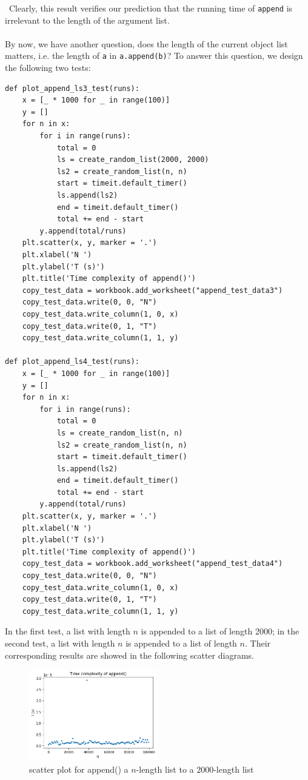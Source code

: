 \documentclass[12pt]{article}
\begin{document}
\newpage ~\newline\noindent Clearly, this result verifies our prediction that the running time of \verb|append| is irrelevant to the length of the argument list.\\\\
By now, we have another question, does the length of the current object list matters, i.e. the length of \verb|a| in \verb|a.append(b)|? To answer this question, we design the following two tests:
\lstset{language=Python, basicstyle=\ttfamily\small, breaklines=true, showspaces=false,
  showstringspaces=false, breakatwhitespace=true}
\begin{lstlisting}
def plot_append_ls3_test(runs):
    x = [_ * 1000 for _ in range(100)]
    y = []
    for n in x:
        for i in range(runs):
            total = 0
            ls = create_random_list(2000, 2000)
            ls2 = create_random_list(n, n)
            start = timeit.default_timer()
            ls.append(ls2)
            end = timeit.default_timer()
            total += end - start
        y.append(total/runs)
    plt.scatter(x, y, marker = '.')
    plt.xlabel('N ')
    plt.ylabel('T (s)')
    plt.title('Time complexity of append()')
    copy_test_data = workbook.add_worksheet("append_test_data3")
    copy_test_data.write(0, 0, "N")
    copy_test_data.write_column(1, 0, x)
    copy_test_data.write(0, 1, "T")
    copy_test_data.write_column(1, 1, y)
    
def plot_append_ls4_test(runs):
    x = [_ * 1000 for _ in range(100)]
    y = []
    for n in x:
        for i in range(runs):
            total = 0
            ls = create_random_list(n, n)
            ls2 = create_random_list(n, n)
            start = timeit.default_timer()
            ls.append(ls2)
            end = timeit.default_timer()
            total += end - start
        y.append(total/runs)
    plt.scatter(x, y, marker = '.')
    plt.xlabel('N ')
    plt.ylabel('T (s)')
    plt.title('Time complexity of append()')
    copy_test_data = workbook.add_worksheet("append_test_data4")
    copy_test_data.write(0, 0, "N")
    copy_test_data.write_column(1, 0, x)
    copy_test_data.write(0, 1, "T")
    copy_test_data.write_column(1, 1, y)
\end{lstlisting}
In the first test, a list with length $n$ is appended to a list of length 2000; in the second test, a list with length $n$ is appended to a list of length $n$. Their corresponding results are showed in the following scatter diagrams.
\begin{figure}[h!]
\centering
\includegraphics[width=0.5\textwidth,height=\textheight,keepaspectratio]{figure_6.png}
\caption{scatter plot for append() a $n$-length list to a $2000$-length list}
\label{Figure: 6}
\end{figure}
\end{document}

